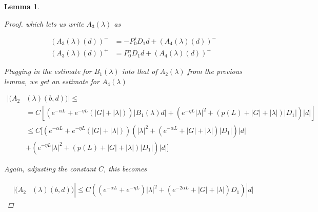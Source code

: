 \documentclass[12pt]{article}
\newtheorem{lemma}{Lemma}
\begin{document}
\begin{lemma}
\begin{proof}
which lets us write $A_3(\lambda)$ as 

\begin{align*}
(A_3(\lambda)(d))^- &= -P_0^s D_1 d + (A_4(\lambda)(d))^-\\
(A_3(\lambda)(d))^+ &= P_0^u D_1 d + (A_4(\lambda)(d))^+
\end{align*}

Plugging in the estimate for $B_1(\lambda)$ into that of $A_2(\lambda)$ from the previous lemma, we get an estimate for $A_4(\lambda)$ 

\begin{align*}
|(A_2&(\lambda)(b,d))| \leq \\
&= C \left[ \left( e^{-\alpha L} + e^{-\eta L} \left(|G| + |\lambda|\right)\right) |B_1(\lambda)d|
+ \left( e^{-\eta L} |\lambda|^2 + \left( p(L) + |G| + |\lambda| \right)|D_1| \right)|d| \right]\\
&\leq C [ \left( e^{-\alpha L} + e^{-\eta L} \left(|G| + |\lambda|\right)\right) (|\lambda|^2 + (e^{-\alpha L} + |G| + |\lambda|)|D_1| )|d|\\
&+ \left( e^{-\eta L} |\lambda|^2 + \left( p(L) + |G| + |\lambda| \right)|D_1| \right)|d| ]
\end{align*}

Again, adjusting the constant $C$, this becomes

\begin{align*}
|(A_2&(\lambda)(b,d))| \leq C ( (e^{-\alpha L} + e^{-\eta L} )|\lambda|^2 + (e^{-2\alpha L} + |G| + |\lambda|)D_1)|d|
\end{align*}

\end{proof}



\end{lemma}
\end{document}

